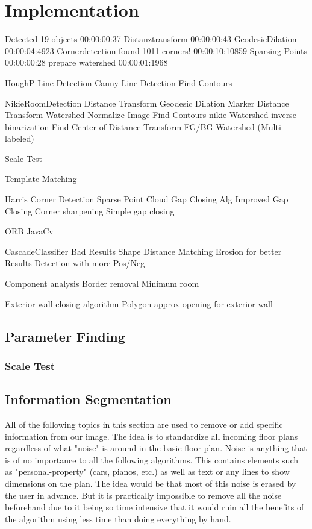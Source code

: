 \section{Implementation}
Detected 19 objects
00:00:00:37
Distanztransform
00:00:00:43
GeodesicDilation
00:00:04:4923
Cornerdetection
found 1011 corners!
00:00:10:10859
Sparsing Points
00:00:00:28
prepare watershed
00:00:01:1968

HoughP Line Detection
Canny Line Detection
Find Contours

NikieRoomDetection
Distance Transform
Geodesic Dilation
Marker Distance Transform
Watershed
Normalize Image
Find Contours nikie
Watershed inverse binarization
Find Center of Distance Transform
FG/BG Watershed (Multi labeled)

Scale Test

Template Matching

Harris Corner Detection
Sparse Point Cloud
Gap Closing Alg
Improved Gap Closing
Corner sharpening
Simple gap closing

ORB
JavaCv

CascadeClassifier
Bad Results
Shape Distance Matching
Erosion for better Results
Detection with more Pos/Neg

Component analysis
Border removal
Minimum room

Exterior wall closing algorithm
Polygon approx
opening for exterior wall





\subsection{Parameter Finding}
\label{subsec:Parameter Finding}
\subsubsection{Scale Test}

\subsection{Information Segmentation}


All of the following topics in this section are used to remove or add specific information from our image. The idea is to standardize all incoming floor plans regardless of what "noise" is around in the basic floor plan. Noise is anything that is of no importance to all the following algorithms. This contains elements such as "personal-property" (cars, pianos, etc.) as well as text or any lines to show dimensions on the plan. The idea would be that most of this noise is erased by the user in advance. But it is practically impossible to remove all the noise beforehand due to it being so time intensive that it would ruin all the benefits of the algorithm using less time than doing everything by hand.


